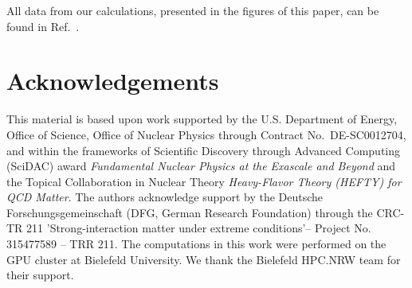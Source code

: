 \documentclass[floatfix,twocolumn,prd,showpacs,preprintnumbers,amsmath,nofootinbib,amssymb,superscriptaddress]{revtex4-2}
\begin{document}
All data from our calculations, presented in the figures of this paper, can be found in Ref.~\cite{BBdatapublication}.

\section*{Acknowledgements}

This material is based upon work supported by the U.S. Department of Energy, Office of Science, Office of Nuclear Physics through Contract No.~DE-SC0012704, and within the frameworks of Scientific Discovery through Advanced Computing (SciDAC) award \textit{Fundamental Nuclear Physics at the Exascale and Beyond} and the Topical Collaboration in Nuclear Theory \textit{Heavy-Flavor Theory (HEFTY) for QCD Matter}.
The authors acknowledge support by the Deutsche For\-schungs\-ge\-mein\-schaft
(DFG, German Research Foundation) through the CRC-TR 211 'Strong-interaction matter under extreme conditions'– Project No. 315477589 – TRR 211. The computations in this work were performed on the GPU cluster at Bielefeld University.
We thank the Bielefeld HPC.NRW team for their support.



\end{document}
